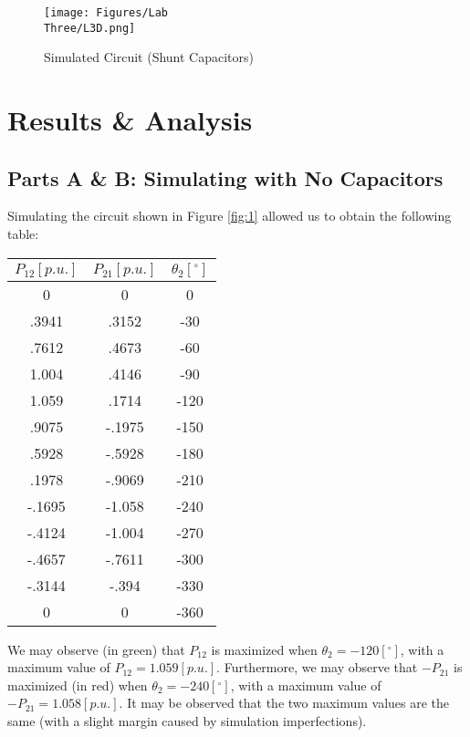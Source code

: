 \documentclass[
	letterpaper, %
	10pt, %
]{CSUniSchoolLabReport}
\begin{document}
\begin{figure}[H]
  \centering
  \texttt{[image: Figures/Lab\\ Three/L3D.png]}
  \caption{Simulated Circuit (Shunt Capacitors)}
  \label{fig:2}
\end{figure}


\section{Results \& Analysis} 

\subsection{Parts A \& B: Simulating with No Capacitors}

Simulating the circuit shown in Figure \ref{fig:1} allowed us to obtain the following table:

\begin{center}
  \begin{tabular}[H]{|c|c|c|}
    \hline
    $P_{12}[p.u.]$ & $P_{21}[p.u.]$ & $\theta_2[^{\circ}]$\\
    \hline
    0 & 0 & 0\\
    \hline
    .3941 & .3152 & -30\\
    \hline
    .7612 & .4673 & -60\\
    \hline
    1.004 & .4146 & -90\\
    \hline
    \cellcolor{green} 1.059 & .1714 & -120\\
    \hline
    .9075 & -.1975 & -150\\
    \hline
    .5928 & -.5928 & -180\\
    \hline
    .1978 & -.9069 & -210\\
    \hline
    -.1695 & \cellcolor{red} -1.058 & -240\\
    \hline
    -.4124 & -1.004 & -270\\
    \hline
    -.4657 & -.7611 & -300\\
    \hline
    -.3144 & -.394 & -330\\
    \hline
    0 & 0 & -360\\
    \hline
  \end{tabular}
\end{center}

We may observe (in green) that $P_{12}$ is maximized when $\theta_2=-120[^{\circ}]$, with a maximum value of $P_{12}=1.059[p.u.]$. Furthermore, we may observe that $-P_{21}$ is maximized (in red) when $\theta_2=-240[^{\circ}]$, with a maximum value of $-P_{21}=1.058[p.u.]$. It may be observed that the two maximum values are the same (with a slight margin caused by simulation imperfections).
\end{document}
